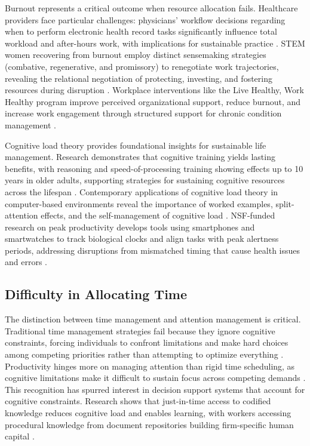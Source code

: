 Burnout represents a critical outcome when resource allocation fails. Healthcare providers face particular challenges: physicians' workflow decisions regarding when to perform electronic health record tasks significantly influence total workload and after-hours work, with implications for sustainable practice \citep{celik_frontiers_2024}. STEM women recovering from burnout employ distinct sensemaking strategies (combative, regenerative, and promissory) to renegotiate work trajectories, revealing the relational negotiation of protecting, investing, and fostering resources during disruption \citep{lee_beyond_2024}. Workplace interventions like the Live Healthy, Work Healthy program improve perceived organizational support, reduce burnout, and increase work engagement through structured support for chronic condition management \citep{haynes_evaluating_2021}.

Cognitive load theory provides foundational insights for sustainable life management. Research demonstrates that cognitive training yields lasting benefits, with reasoning and speed-of-processing training showing effects up to 10 years in older adults, supporting strategies for sustaining cognitive resources across the lifespan \citep{NIA2014}. Contemporary applications of cognitive load theory in computer-based environments reveal the importance of worked examples, split-attention effects, and the self-management of cognitive load \citep{ayres_something_2020}. NSF-funded research on peak productivity develops tools using smartphones and smartwatches to track biological clocks and align tasks with peak alertness periods, addressing disruptions from mismatched timing that cause health issues and errors \citep{Lefkowitz2018}.



\subsection{Difficulty in Allocating Time}

The distinction between time management and attention management is critical. Traditional time management strategies fail because they ignore cognitive constraints, forcing individuals to confront limitations and make hard choices among competing priorities rather than attempting to optimize everything \citep{Hart2024}. Productivity hinges more on managing attention than rigid time scheduling, as cognitive limitations make it difficult to sustain focus across competing demands \citep{Grant2019}. This recognition has spurred interest in decision support systems that account for cognitive constraints. Research shows that just-in-time access to codified knowledge reduces cognitive load and enables learning, with workers accessing procedural knowledge from document repositories building firm-specific human capital \citep{subramani_capability_2021}.

